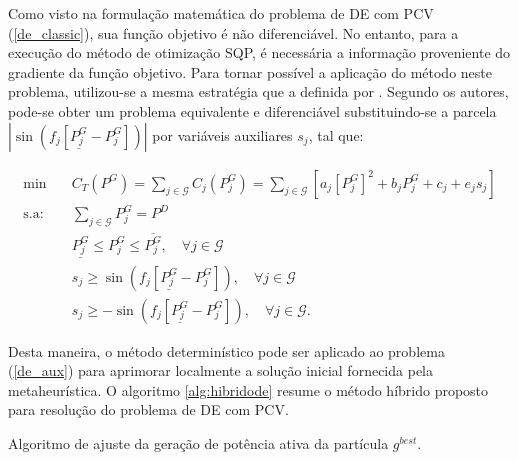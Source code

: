 \documentclass[
	12pt,				%
	openany,			%
	twoside,			%
	a4paper,			%
	chapter=TITLE,		%
	section=Title,		%
	subsection=Title,	%
	subsubsection=Title,%
	english,			%
	french,				%
	spanish,			%
	brazil			%
	]{abntex2}
\begin{document}
\begin{ERRATA}
Como visto na formulação matemática do problema de DE com PCV (\ref{de_classic}),  sua função objetivo é não diferenciável. No entanto, para a execução do método de otimização SQP, é necessária a informação proveniente do gradiente da função objetivo. Para tornar possível a aplicação do método neste problema, utilizou-se a mesma estratégia que a definida por . Segundo os autores, pode-se obter um problema equivalente e diferenciável substituindo-se a parcela $|\sin(f_j[\underline{P^{G}_j}-P^{G}_j])|$ por variáveis auxiliares $s_j$, tal que:

\begin{equation}\label{de_aux}
\begin{aligned}
\text{min}  &\quad C_T(P^{G}) = \sum_{j \in \mathcal{G}} C_j(P^{G}_j) = \sum_{j \in \mathcal{G}} [a_j[P^{G}_j]^2 + b_jP^{G}_j + c_j + e_js_j]\\
\text{s.a:} &\quad \sum_{j \in \mathcal{G}}P^G_j = P^D \\
&\quad \underline{P^{G}_{j}} \leq P^{G}_{j} \leq \overline{P^{G}_{j}},\quad \forall j \in \mathcal{G}\\
&\quad s_j \geq \sin(f_j[\underline{P^{G}_j}-P^{G}_j]), \quad \forall j \in \mathcal{G}\\
&\quad s_j \geq -\sin(f_j[\underline{P^{G}_j}-P^{G}_j]), \quad \forall j \in \mathcal{G}.
\end{aligned}
\end{equation}


Desta maneira, o método determinístico pode ser aplicado ao problema (\ref{de_aux}) para aprimorar localmente a solução inicial fornecida pela metaheurística. O algoritmo \ref{alg:hibridode} resume o método híbrido proposto para resolução do problema de DE com PCV.


\begin{algorithm}[b!]
\caption{\label{alg:demanda} Algoritmo de ajuste da geração de potência ativa da partícula $g^{best}$.}

\\




\end{algorithm}
\end{ERRATA}
\end{document}
